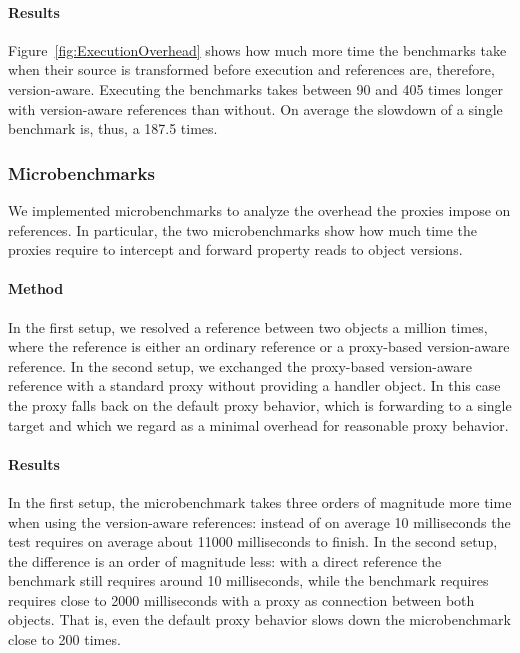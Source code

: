 \paragraph{Results}
Figure~\ref{fig:ExecutionOverhead} shows how much more time the benchmarks take when their source is transformed before execution and references are, therefore, version-aware.
Executing the benchmarks takes between 90 and 405 times longer with version-aware references than without.
On average the slowdown of a single benchmark is, thus, a 187.5 times.


\subsubsection{Microbenchmarks}

We implemented microbenchmarks to analyze the overhead the proxies impose on references.
In particular, the two microbenchmarks show how much time the proxies require to intercept and forward property reads to object versions.

\paragraph{Method}
In the first setup, we resolved a reference between two objects a million times, where the reference is either an ordinary reference or a proxy-based version-aware reference.
In the second setup, we exchanged the proxy-based version-aware reference with a standard proxy without providing a handler object.
In this case the proxy falls back on the default proxy behavior, which is forwarding to a single target and which we regard as a minimal overhead for reasonable proxy behavior. 

\paragraph{Results}
In the first setup, the microbenchmark takes three orders of magnitude more time when using the version-aware references: instead of on average 10 milliseconds the test requires on average about 11000 milliseconds to finish.
In the second setup, the difference is an order of magnitude less: with a direct reference the benchmark still requires around 10 milliseconds, while the benchmark requires requires close to 2000 milliseconds with a proxy as connection between both objects.
That is, even the default proxy behavior slows down the microbenchmark close to 200 times.



